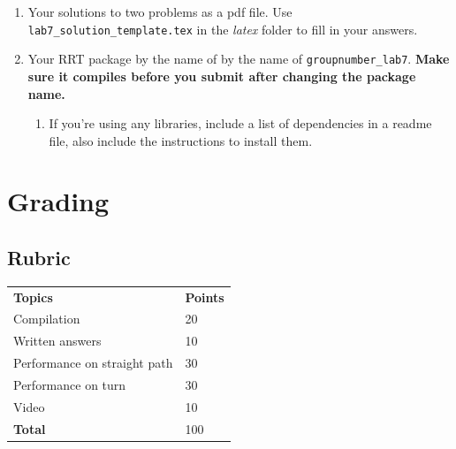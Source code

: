 \documentclass[letta4 paper]{article}
\numberwithin{equation}{section}
\newcommand{\0}{\mathbf{0}}
\begin{document}
	\begin{enumerate}
		\item Your solutions to two problems as a pdf file. Use \texttt{lab7\_solution\_template.tex} in the \textit{latex} folder to fill in your answers.	
		\item Your RRT package by the name of by the name of \texttt{groupnumber\_lab7}. \textbf{Make sure it compiles before you submit after changing the package name.}
			\begin{enumerate}
				\item If you’re using any libraries, include a list of dependencies in a readme file, also include the instructions to install them.
			\end{enumerate}
			
	\end{enumerate}

	\section{Grading}
	
	\subsection{Rubric}
	\begin{table}[h]
		\begin{tabular}{ll}
			\textbf{Topics} & \textbf{Points} \\
			Compilation & 20 \\
			Written answers & 10 \\
			Performance on straight path & 30 \\
			Performance on turn & 30 \\
			Video & 10 \\
			\textbf{Total} & 100 \\
		\end{tabular}
	\end{table}
	

	
			
\end{document}
